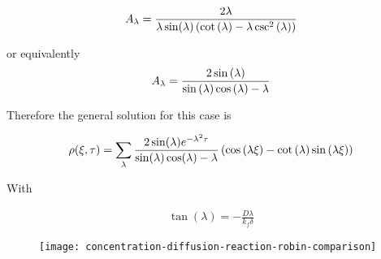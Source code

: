 \begin{align}
A_{\lambda} = \frac{2\lambda}{\lambda \sin(\lambda)\left({\cot\left({\lambda}\right) -  \lambda \csc^2\left({\lambda}\right)}\right)}
\end{align}

or equivalently
\begin{align}
A_{\lambda} = \frac{2 \sin\left({\lambda}\right)}{\sin\left({\lambda}\right)\cos\left({\lambda}\right)-\lambda}
\end{align}

Therefore the general solution for this case is

\begin{align}
	\rho(\xi,\tau) = \sum_\lambda  \frac{2\sin(\lambda)e^{-\lambda^2\tau}}{\sin(\lambda)\cos(\lambda)-\lambda}\left({\cos{(\lambda\xi)} - \cot\left({\lambda}\right)\sin\left({\lambda\xi}\right)}\right)
\end{align}

With 

\begin{align}
	\tan(\lambda) = -\frac{D\lambda}{k_f\delta}
\end{align}






\begin{figure}[htbp]
\centering
\texttt{[image: concentration-diffusion-reaction-robin-comparison]}
\caption{}
\label{fig:diffusion-reaction-comparison}
\end{figure}
